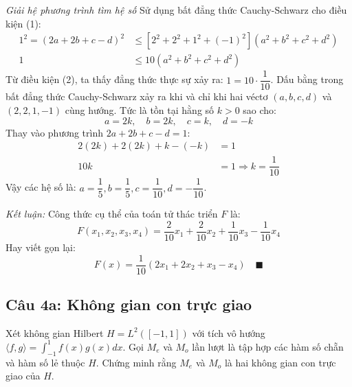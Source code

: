 \begin{solution}
\textit{Giải hệ phương trình tìm hệ số}
Sử dụng bất đẳng thức Cauchy-Schwarz cho điều kiện (1):
\begin{align*}
    1^2 = (2a + 2b + c - d)^2 &\leq \left[ 2^2 + 2^2 + 1^2 + (-1)^2 \right](a^2 + b^2 + c^2 + d^2) \\
    1 &\leq 10(a^2 + b^2 + c^2 + d^2)
\end{align*}
Từ điều kiện (2), ta thấy đẳng thức thực sự xảy ra: $1 = 10 \cdot \dfrac{1}{10}$.
Dấu bằng trong bất đẳng thức Cauchy-Schwarz xảy ra khi và chỉ khi hai véctơ $(a,b,c,d)$ và $(2,2,1,-1)$ cùng hướng. Tức là tồn tại hằng số $k > 0$ sao cho:
\[
    a = 2k, \quad b = 2k, \quad c = k, \quad d = -k
\]
Thay vào phương trình $2a + 2b + c - d = 1$:
\begin{align*}
    2(2k) + 2(2k) + k - (-k) &= 1 \\
    10k &= 1 \Rightarrow k = \dfrac{1}{10}
\end{align*}
Vậy các hệ số là: $a = \dfrac{1}{5}, b = \dfrac{1}{5}, c = \dfrac{1}{10}, d = -\dfrac{1}{10}$.

\textit{Kết luận:}
Công thức cụ thể của toán tử thác triển $F$ là:
\[ 
    F(x_1, x_2, x_3, x_4) = \dfrac{2}{10}x_1 + \dfrac{2}{10}x_2 + \dfrac{1}{10}x_3 - \dfrac{1}{10}x_4 
\]
Hay viết gọn lại:
\[ 
    F(x) = \dfrac{1}{10}(2x_1 + 2x_2 + x_3 - x_4) \quad \blacksquare 
\]
\end{solution}

\subsection*{Câu 4a: Không gian con trực giao}

\begin{questionbox}
Xét không gian Hilbert $H = L^2([-1, 1])$ với tích vô hướng $\langle f,g \rangle = \int_{-1}^1 f(x)g(x)dx$. Gọi $M_e$ và $M_o$ lần lượt là tập hợp các hàm số chẵn và hàm số lẻ thuộc $H$. Chứng minh rằng $M_e$ và $M_o$ là hai không gian con trực giao của $H$.
\end{questionbox}


